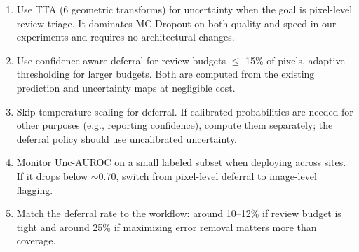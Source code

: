 \begin{enumerate}[leftmargin=*]
\item Use TTA (6 geometric transforms) for uncertainty when the goal is
pixel-level review triage. It dominates MC Dropout on both quality and speed
in our experiments and requires no architectural changes.

\item Use confidence-aware deferral for review budgets $\leq$ 15\% of pixels,
adaptive thresholding for larger budgets. Both are computed from the existing
prediction and uncertainty maps at negligible cost.

\item Skip temperature scaling for deferral. If calibrated probabilities are
needed for other purposes (e.g., reporting confidence), compute them
separately; the deferral policy should use uncalibrated uncertainty.

\item Monitor Unc-AUROC on a small labeled subset when deploying across sites.
If it drops below $\sim$0.70, switch from pixel-level deferral to image-level
flagging.

\item Match the deferral rate to the workflow: around 10--12\% if review
budget is tight and around 25\% if maximizing error removal matters more than
coverage.
\end{enumerate}
